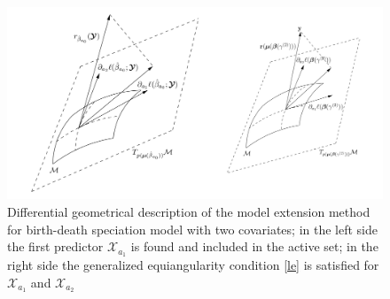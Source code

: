 \begin{figure}
\includegraphics[scale=0.4]{Pictures/diff.png}
\caption{Differential geometrical description of the model extension method for birth-death speciation model with two covariates; in the left side the first predictor $\mathcal{X}_{a_1}$ is found and included in the active set; in the right side the generalized equiangularity condition \ref{le} is satisfied for $\mathcal{X}_{a_1}$ and $\mathcal{X}_{a_2}$ \cite{augugliaro2013differential}}
\label{dglars} 
\end{figure}



 